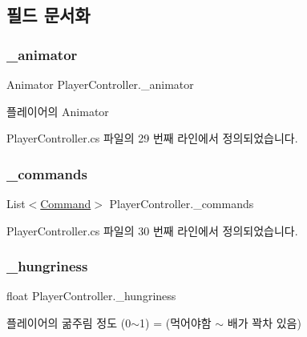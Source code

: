 \subsection{필드 문서화}
\mbox{\label{class_player_controller_ada29d77d333483963257e51a6e15b8ae}} 
\subsubsection{\texorpdfstring{\_animator}{\_animator}}
{\footnotesize\ttfamily Animator Player\+Controller.\+\_\+animator}



플레이어의 Animator 



Player\+Controller.\+cs 파일의 29 번째 라인에서 정의되었습니다.

\mbox{\label{class_player_controller_aab899fbdea369867174253d2efd978fe}} 
\subsubsection{\texorpdfstring{\_commands}{\_commands}}
{\footnotesize\ttfamily List$<$\mbox{\hyperlink{class_command}{Command}}$>$ Player\+Controller.\+\_\+commands}



Player\+Controller.\+cs 파일의 30 번째 라인에서 정의되었습니다.

\mbox{\label{class_player_controller_ab4fed78a016e8baca12e50bb3d7f034a}} 
\subsubsection{\texorpdfstring{\_hungriness}{\_hungriness}}
{\footnotesize\ttfamily float Player\+Controller.\+\_\+hungriness}



플레이어의 굶주림 정도 (0$\sim$1) = (먹어야함 $\sim$ 배가 꽉차 있음) 



